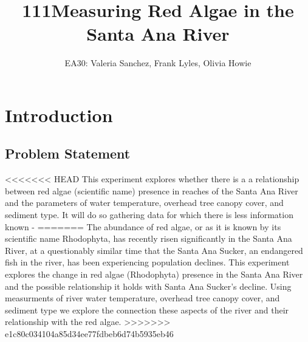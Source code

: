 \documentclass{article}\usepackage[]{graphicx}\usepackage[]{color}
\title{111Measuring Red Algae in the Santa Ana River}
\author{EA30: Valeria Sanchez, Frank Lyles, Olivia Howie}
\begin{document}


\maketitle

\newpage
\tableofcontents
\newpage

\section{Introduction}


\subsection{Problem Statement}
<<<<<<< HEAD
This experiment explores whether there is a a relationship between red algae (scientific name) presence in reaches of the Santa Ana River
and the parameters of water temperature, overhead tree canopy cover, and sediment type. It will do so gathering data for which there is less information known - 
=======
The abundance of red algae, or as it is known by its scientific name Rhodophyta, has recently risen significantly in the Santa Ana River, at a questionably similar time that the Santa Ana Sucker, an endangered fish in the river, has been experiencing population declines. This experiment explores the change in red algae (Rhodophyta) presence in the Santa Ana River and the possible relationship it holds with Santa Ana Sucker's decline. Using measurments of river water temperature, overhead tree canopy cover, and sediment type we explore the connection these aspects of the river and their relationship with the red algae.
>>>>>>> e1c80c034104a85d34ee77fdbeb6d74b5935eb46
\end{document}
